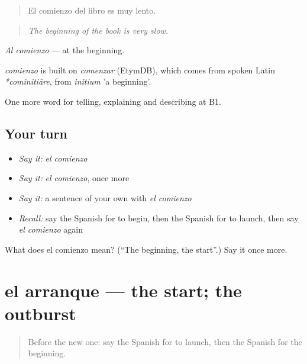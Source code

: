 \begin{quote}
El comienzo del libro es muy lento.
\end{quote}

\begin{quote}
\emph{The beginning of the book is very slow.}
\end{quote}

\emph{Al comienzo} — at the beginning.

\begin{cousinweb}
\emph{comienzo} is built on \emph{comenzar} (EtymDB), which comes from spoken Latin \emph{*cominitiāre}, from \emph{initium} 'a beginning'.
\end{cousinweb}

\begin{grammarlens}[title={What you've built}]
One more word for telling, explaining and describing at B1.
\end{grammarlens}

\subsection*{Your turn}
\begin{itemize}
\raggedright
  \item \emph{Say it:} \emph{el comienzo}
  \item \emph{Say it:} \emph{el comienzo}, once more
  \item \emph{Say it:} a sentence of your own with \emph{el comienzo}
  \item \emph{Recall:} say the Spanish for to begin, then the Spanish for to launch, then say \emph{el comienzo} again
\end{itemize}

\begin{tcolorbox}[breakable,colback=teal!4,colframe=teal!35!black,title={Before you move on}]
What does el comienzo mean? (\textquotedblleft{}The beginning, the start\textquotedblright{}.) Say it once more.
\end{tcolorbox}
\section[el arranque]{el arranque — the start; the outburst}

\label{lesson:ES-C542-arranque}



\begin{quote}
Before the new one: say the Spanish for to launch, then the Spanish for the beginning.
\end{quote}

